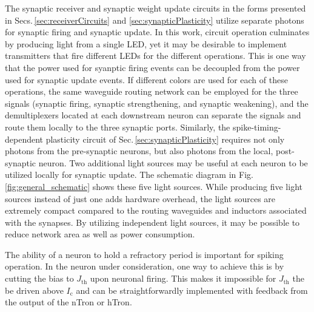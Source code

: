 \documentclass[aip,amsmath,amssymb,reprint,nofootinbib]{revtex4-1}
\begin{document}
The synaptic receiver and synaptic weight update circuits in the forms presented in Secs.\,\ref{sec:receiverCircuits} and \ref{sec:synapticPlasticity} utilize separate photons for synaptic firing and synaptic update. In this work, circuit operation culminates by producing light from a single LED, yet it may be desirable to implement transmitters that fire different LEDs for the different operations. This is one way that the power used for syanptic firing events can be decoupled from the power used for synaptic update events. If different colors are used for each of these operations, the same waveguide routing network can be employed for the three signals (synaptic firing, synaptic strengthening, and synaptic weakening), and the demultiplexers located at each downstream neuron can separate the signals and route them locally to the three synaptic ports. Similarly, the spike-timing-dependent plasticity circuit of Sec.\,\ref{sec:synapticPlasticity} requires not only photons from the pre-synaptic neurons, but also photons from the local, post-synaptic neuron. Two additional light sources may be useful at each neuron to be utilized locally for synaptic update. The schematic diagram in Fig.\,\ref{fig:general_schematic} shows these five light sources. While producing five light sources instead of just one adds hardware overhead, the light sources are extremely compact compared to the routing waveguides and inductors associated with the synapses. By utilizing independent light sources, it may be possible to reduce network area as well as power consumption.

The ability of a neuron to hold a refractory period is important for spiking operation. In the neuron under consideration, one way to achieve this is by cutting the bias to $J_{\mathrm{th}}$ upon neuronal firing. This makes it impossible for $J_{\mathrm{th}}$ the be driven above $I_{\mathrm{c}}$ and can be straightforwardly implemented with feedback from the output of the nTron or hTron.
\end{document}
